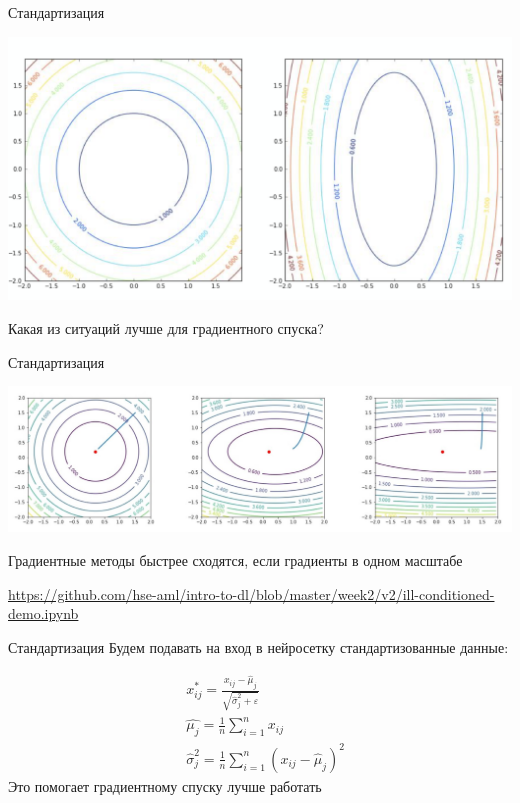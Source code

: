 \documentclass[notes,12pt, aspectratio=169]{beamer}
\begin{document}
\begin{frame}{Стандартизация}
	\begin{center}
		\includegraphics[width=.8\linewidth]{standartization.png}
	\end{center}
	
	\begin{center}
		Какая из ситуаций лучше для градиентного спуска? 
	\end{center}
\end{frame}


\begin{frame}{Стандартизация}
	\begin{center}
		\includegraphics[width=.99\linewidth]{standartization2.png}
	\end{center}
	
	\alert{Градиентные методы быстрее сходятся, если градиенты в одном масштабе}
	
	\vfill %
	\footnotesize
	{\color{blue} \url{https://github.com/hse-aml/intro-to-dl/blob/master/week2/v2/ill-conditioned-demo.ipynb}}
\end{frame}


\begin{frame}{Стандартизация}
Будем подавать на вход в нейросетку стандартизованные данные:

\begin{equation*}
	\begin{aligned}
		&x_{ij}^{*} = \frac{x_{ij} - \hat{\mu}_j}{\sqrt{\hat{\sigma}^2_j + \varepsilon}} \\
		&\hat{\mu_j} = \frac{1}{n} \sum_{i=1}^n x_{ij} \\
		& \hat{\sigma}^2_j =  \frac{1}{n} \sum_{i=1}^n (x_{ij} - \hat{\mu}_j)^2
	\end{aligned}
\end{equation*}
\vfill \centering
\alert{Это помогает градиентному спуску лучше работать}
\end{frame}
\end{document}
